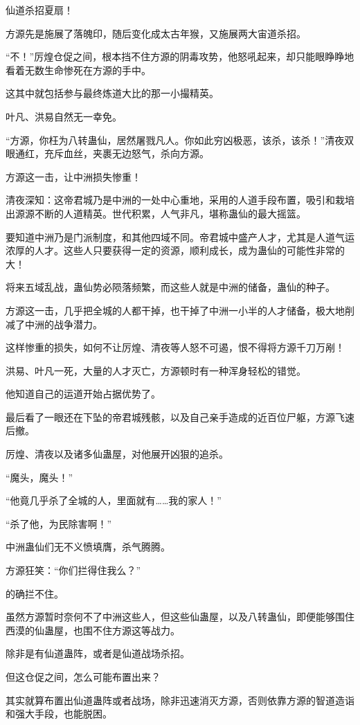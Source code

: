 \begin{this_body}
仙道杀招夏扇！

方源先是施展了落魄印，随后变化成太古年猴，又施展两大宙道杀招。

“不！”厉煌仓促之间，根本挡不住方源的阴毒攻势，他怒吼起来，却只能眼睁睁地看着无数生命惨死在方源的手中。

这其中就包括参与最终炼道大比的那一小撮精英。

叶凡、洪易自然无一幸免。

“方源，你枉为八转蛊仙，居然屠戮凡人。你如此穷凶极恶，该杀，该杀！”清夜双眼通红，充斥血丝，夹裹无边怒气，杀向方源。

方源这一击，让中洲损失惨重！

清夜深知：这帝君城乃是中洲的一处中心重地，采用的人道手段布置，吸引和栽培出源源不断的人道精英。世代积累，人气非凡，堪称蛊仙的最大摇篮。

要知道中洲乃是门派制度，和其他四域不同。帝君城中盛产人才，尤其是人道气运浓厚的人才。这些人只要获得一定的资源，顺利成长，成为蛊仙的可能性非常的大！

将来五域乱战，蛊仙势必陨落频繁，而这些人就是中洲的储备，蛊仙的种子。

方源这一击，几乎把全城的人都干掉，也干掉了中洲一小半的人才储备，极大地削减了中洲的战争潜力。

这样惨重的损失，如何不让厉煌、清夜等人怒不可遏，恨不得将方源千刀万剐！

洪易、叶凡一死，大量的人才灭亡，方源顿时有一种浑身轻松的错觉。

他知道自己的运道开始占据优势了。

最后看了一眼还在下坠的帝君城残骸，以及自己亲手造成的近百位尸躯，方源飞速后撤。

厉煌、清夜以及诸多仙蛊屋，对他展开凶狠的追杀。

“魔头，魔头！”

“他竟几乎杀了全城的人，里面就有……我的家人！”

“杀了他，为民除害啊！”

中洲蛊仙们无不义愤填膺，杀气腾腾。

方源狂笑：“你们拦得住我么？”

的确拦不住。

虽然方源暂时奈何不了中洲这些人，但这些仙蛊屋，以及八转蛊仙，即便能够围住西漠的仙蛊屋，也围不住方源这等战力。

除非是有仙道蛊阵，或者是仙道战场杀招。

但这仓促之间，怎么可能布置出来？

其实就算布置出仙道蛊阵或者战场，除非迅速消灭方源，否则依靠方源的智道造诣和强大手段，也能脱困。


\end{this_body}
